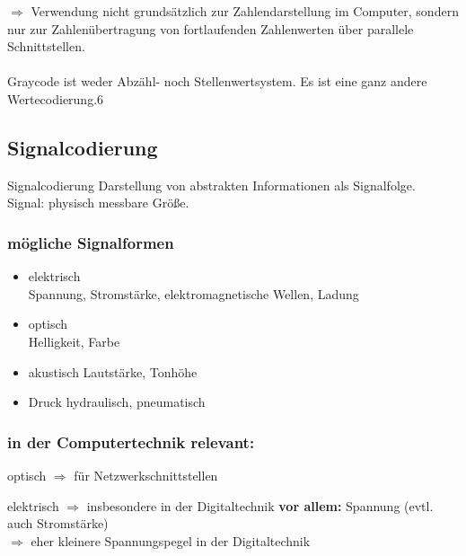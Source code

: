 \documentclass[10pt,a4paper]{scrartcl}
\begin{document}
\noindent
$\Rightarrow$ Verwendung nicht grundsätzlich zur Zahlendarstellung im Computer, sondern nur zur Zahlenübertragung von fortlaufenden Zahlenwerten über parallele Schnittstellen.\\
\\
Graycode ist weder Abzähl- noch Stellenwertsystem. Es ist eine ganz andere Wertecodierung.6

\newpage
\subsection{Signalcodierung}

\begin{Theorem}{Signalcodierung}{}
	Darstellung von abstrakten Informationen als Signalfolge. \\
	Signal: physisch messbare Größe.
\end{Theorem}

\subsubsection{mögliche Signalformen}
\begin{itemize}
	\renewcommand\labelitemi{--}
	
	\item elektrisch\\
		Spannung, Stromstärke, elektromagnetische Wellen, Ladung
	\item optisch\\
		Helligkeit, Farbe
	\item akustisch
		Lautstärke, Tonhöhe
	\item Druck
		hydraulisch, pneumatisch
\end{itemize}

\subsubsection*{in der Computertechnik relevant:}

\begin{list}{}{}
	\item[] optisch $\Rightarrow$ für Netzwerkschnittstellen
	\item elektrisch $\Rightarrow$ insbesondere in der Digitaltechnik
	\subitem \textbf{vor allem:} Spannung (evtl. auch Stromstärke)\\
	\hspace*{2em}$\Rightarrow$ eher kleinere Spannungspegel in der Digitaltechnik
\end{list}
\end{document}
